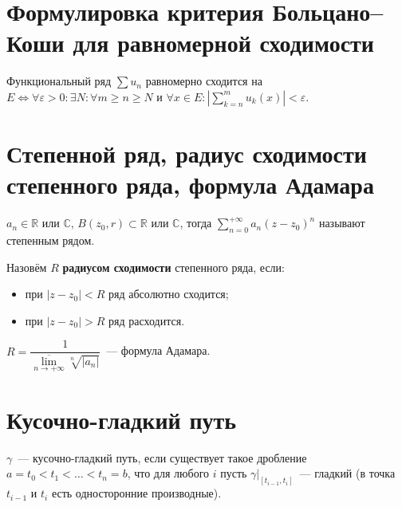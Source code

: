 \documentclass{article}
\begin{document}
    \newpage
    
    \section{Формулировка критерия Больцано--Коши для равномерной сходимости}
    
        Функциональный ряд $\sum u_n$ равномерно сходится на $E \Longleftrightarrow \forall \varepsilon > 0 : \exists N : \forall m \geq n \geq N$ и $\forall x \in E : \left| \sum\limits^m_{k = n} u_k(x) \right| < \varepsilon$.
        
    \newpage
    
    \section{Степенной ряд, радиус сходимости степенного ряда, формула Адамара}
    
        $a_n \in \mathbb{R}$ или $\mathbb{C}$, $B(z_0, r) \subset \mathbb{R}$ или $\mathbb{C}$, тогда $\sum\limits^{+\infty}_{n = 0} a_n (z - z_0)^n$ называют степенным рядом.
        
        Назовём $R$ \textbf{радиусом сходимости} степенного ряда, если:
        
            \begin{itemize}
            
                \item при $|z - z_0| < R$ ряд абсолютно сходится;
                
                \item при $|z - z_0| > R$ ряд расходится.
                
            \end{itemize}
        
        $R = \dfrac{1}{\overline{\lim\limits_{n \rightarrow +\infty}} \sqrt[n]{|a_n|}}$~--- формула Адамара.
    
    \newpage
    
    \section{Кусочно-гладкий путь}
    
        $\gamma$~--- кусочно-гладкий путь, если существует такое дробление $a = t_0 < t_1 < \ldots < t_n = b$, что для любого $i$ пусть $\gamma \big|_{[t_{i - 1}, t_i]}$~--- гладкий (в точка $t_{i - 1}$ и $t_i$ есть односторонние производные).
        
\end{document}

